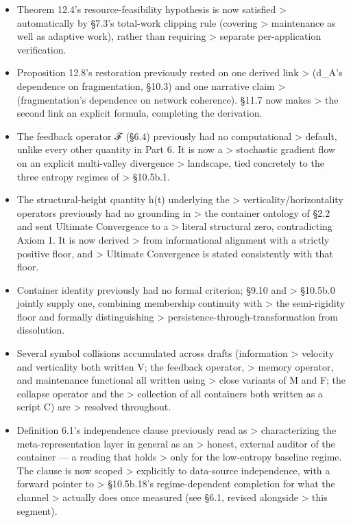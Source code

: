 \documentclass[
]{article}
\begin{document}
\begin{itemize}
\item
  Theorem 12.4's resource-feasibility hypothesis is now satisfied
  \textgreater{} automatically by §7.3's total-work clipping rule
  (covering \textgreater{} maintenance as well as adaptive work), rather
  than requiring \textgreater{} separate per-application verification.
\item
  Proposition 12.8's restoration previously rested on one derived link
  \textgreater{} (d\_A's dependence on fragmentation, §10.3) and one
  narrative claim \textgreater{} (fragmentation's dependence on network
  coherence). §11.7 now makes \textgreater{} the second link an explicit
  formula, completing the derivation.
\item
  The feedback operator ℱ (§6.4) previously had no computational
  \textgreater{} default, unlike every other quantity in Part 6. It is
  now a \textgreater{} stochastic gradient flow on an explicit
  multi-valley divergence \textgreater{} landscape, tied concretely to
  the three entropy regimes of \textgreater{} §10.5b.1.
\item
  The structural-height quantity h(t) underlying the \textgreater{}
  verticality/horizontality operators previously had no grounding in
  \textgreater{} the container ontology of §2.2 and sent Ultimate
  Convergence to a \textgreater{} literal structural zero, contradicting
  Axiom 1. It is now derived \textgreater{} from informational alignment
  with a strictly positive floor, and \textgreater{} Ultimate
  Convergence is stated consistently with that floor.
\item
  Container identity previously had no formal criterion; §9.10 and
  \textgreater{} §10.5b.0 jointly supply one, combining membership
  continuity with \textgreater{} the semi-rigidity floor and formally
  distinguishing \textgreater{} persistence-through-transformation from
  dissolution.
\item
  Several symbol collisions accumulated across drafts (information
  \textgreater{} velocity and verticality both written V; the feedback
  operator, \textgreater{} memory operator, and maintenance functional
  all written using \textgreater{} close variants of M and F; the
  collapse operator and the \textgreater{} collection of all containers
  both written as a script C) are \textgreater{} resolved throughout.
\item
  Definition 6.1's independence clause previously read as \textgreater{}
  characterizing the meta-representation layer in general as an
  \textgreater{} honest, external auditor of the container --- a reading
  that holds \textgreater{} only for the low-entropy baseline regime.
  The clause is now scoped \textgreater{} explicitly to data-source
  independence, with a forward pointer to \textgreater{} §10.5b.18's
  regime-dependent completion for what the channel \textgreater{}
  actually does once measured (see §6.1, revised alongside
  \textgreater{} this segment).
\end{itemize}
\end{document}
